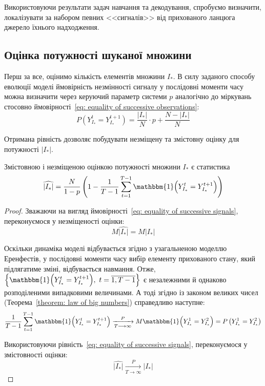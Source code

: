 Використовуючи результати задач навчання та декодування, спробуємо визначити, локалізувати за набором певних <<сигналів>> від прихованого ланцюга джерело їхнього надходження.

\subsection{Оцінка потужності шуканої множини}

Перш за все, оцінимо кількість елементів множини $I_*$. В силу заданого способу еволюції моделі ймовірність незмінності сигналу у послідовні моменти часу можна визначити через керуючий параметр системи $p$ аналогічно до міркувань стосовно ймовірності~\eqref{eq: equality of successive observations}:
\begin{equation}\label{eq: equality of successive signals}
    P\left( Y^t_{I_*}=Y^{t+1}_{I_*} \right) = \frac{\left| I_* \right|}{N}\cdot p + \frac{N-\left| I_* \right|}{N}
\end{equation}

Отримана рівність дозволяє побудувати незміщену та змістовну оцінку для потужності $|I_*|$.

\begin{claim}
    Змістовною і незміщеною оцінкою потужності множини $I_*$ є статистика
    \begin{equation}\label{eq: ||I*|| estimation}
        \widehat{|I_*|} = \frac{N}{1-p} \left( 1-\frac{1}{T-1}\sum_{t=1}^{T-1}\mathbbm{1} \Bigl( Y^t_{I_*}=Y^{t+1}_{I_*} \Bigr) \right) 
    \end{equation}
\end{claim}
\begin{proof}
    Зважаючи на вигляд ймовірності~\eqref{eq: equality of successive signals}, переконуємося у незміщеності оцінки:
    \begin{equation*}
        M\widehat{|I_*|} = M|I_*| 
    \end{equation*}

    Оскільки динаміка моделі відбувається згідно з узагальненою моделлю Еренфестів, у послідовні моменти часу вибір елементу прихованого стану, який підлягатиме зміні, відбувається навмання. Отже, $\left\{ \mathbbm{1} \Bigl( Y^t_{I_*}=Y^{t+1}_{I_*} \Bigr),\ t=\overline{1,T-1} \right\}$ є незалежними й однаково розподіленими випадковими величинами. А тоді згідно із законом великих чисел (Теорема~\ref{theorem: law of big numbers}) справедливо наступне:
    \begin{equation*}
        \frac{1}{T-1}\sum_{t=1}^{T-1}\mathbbm{1} \Bigl( Y^t_{I_*}=Y^{t+1}_{I_*} \Bigr) \xrightarrow[T \longrightarrow \infty]{P} M\mathbbm{1} \Bigl( Y^1_{I_*}=Y^2_{I_*} \Bigr) = P\left( Y^1_{I_*}=Y^2_{I_*} \right)
    \end{equation*}

    Використовуючи рівність~\eqref{eq: equality of successive signals}, переконуємося у змістовності оцінки:
    \begin{equation*}
        \widehat{|I_*|} \xrightarrow[T \longrightarrow \infty]{P} |I_*| 
    \end{equation*}
\end{proof}

